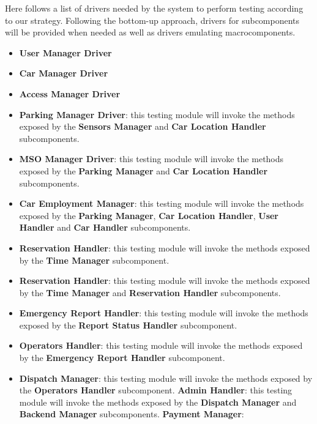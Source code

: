 		Here follows a list of drivers needed by the system to perform testing according to our strategy. Following the bottom-up approach, drivers for subcomponents will be provided when needed as well as drivers emulating macrocomponents.
		
		\begin{itemize}
			\item \textbf{User Manager Driver} %
			\item \textbf{Car Manager Driver} %
			\item \textbf{Access Manager Driver} %
			\item \textbf{Parking Manager Driver}: this testing module will invoke the methods exposed by the \textbf{Sensors Manager} and \textbf{Car Location Handler} subcomponents. %
			\item \textbf{MSO Manager Driver}: this testing module will invoke the methods exposed by the \textbf{Parking  Manager} and \textbf{Car Location Handler} subcomponents.
			\item \textbf{Car Employment Manager}: this testing module will invoke the methods exposed by the \textbf{Parking  Manager}, \textbf{Car Location Handler}, \textbf{User Handler} and \textbf{Car Handler} subcomponents.
			\item \textbf{Reservation Handler}: this testing module will invoke the methods exposed by the \textbf{Time   Manager} subcomponent.
			\item \textbf{Reservation Handler}: this testing module will invoke the methods exposed by the \textbf{Time   Manager} and \textbf{Reservation Handler} subcomponents.
			\item \textbf{Emergency Report Handler}: this testing module will invoke the methods exposed by the \textbf{Report Status Handler} subcomponent.
			\item \textbf{Operators Handler}: this testing module will invoke the methods exposed by the \textbf{Emergency Report Handler} subcomponent.
			\item \textbf{Dispatch Manager}: this testing module will invoke the methods exposed by the \textbf{Operators Handler} subcomponent.
			\textbf{Admin Handler}: this testing module will invoke the methods exposed by the \textbf{Dispatch Manager} and \textbf{Backend Manager} subcomponents.
			\textbf{Payment Manager}: %
		\end{itemize}
		
	
	
